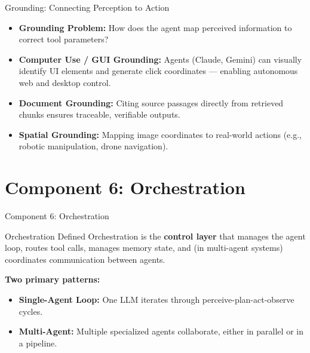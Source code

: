 \documentclass{beamer}       %
\begin{document}
\begin{frame}{Grounding: Connecting Perception to Action}
    \begin{itemize}
        \item \textbf{Grounding Problem:} How does the agent map perceived information to correct tool parameters?
        \item \textbf{Computer Use / GUI Grounding:} Agents (Claude, Gemini) can visually identify UI elements and generate click coordinates --- enabling autonomous web and desktop control.
        \item \textbf{Document Grounding:} Citing source passages directly from retrieved chunks ensures traceable, verifiable outputs.
        \item \textbf{Spatial Grounding:} Mapping image coordinates to real-world actions (e.g., robotic manipulation, drone navigation).
    \end{itemize}
\end{frame}


\section{Component 6: Orchestration}

\begin{frame}{Component 6: Orchestration}
    \begin{block}{Orchestration Defined}
        Orchestration is the \textbf{control layer} that manages the agent loop, routes tool calls, manages memory state, and (in multi-agent systems) coordinates communication between agents.
    \end{block}
    \vspace{0.2cm}
    \textbf{Two primary patterns:}
    \begin{itemize}
        \item \textbf{Single-Agent Loop:} One LLM iterates through perceive-plan-act-observe cycles.
        \item \textbf{Multi-Agent:} Multiple specialized agents collaborate, either in parallel or in a pipeline.
    \end{itemize}
\end{frame}
\end{document}
